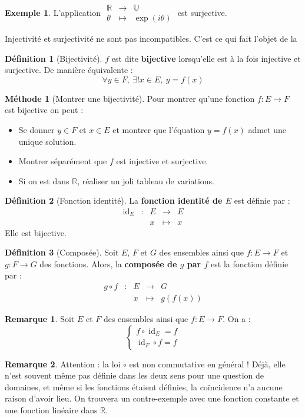\documentclass[french]{book}
\newcommand{\R}{\mathbb{R}}
\newcommand{\U}{\mathbb{U}}
\theoremstyle{plain}
\theoremstyle{definition}
\newtheorem{dfn}{Définition}[chapter]
\newtheorem{exa}{Exemple}[chapter]
\newtheorem{rmq}{Remarque}[chapter]
\newtheorem{met}{Méthode}[chapter]
\theoremstyle{remark}
\DeclareMathOperator{\id}{id}
\begin{document}
\begin{exa}
	L'application $\begin{array}{ccc}\R&\rightarrow&\U\\ \theta&\mapsto&\exp(i\theta)\end{array}$ est surjective.
\end{exa}
Injectivité et surjectivité ne sont pas incompatibles. C'est ce qui fait l'objet de la
\begin{dfn}[Bijectivité]
	$f$ est dite \textbf{bijective} lorsqu'elle est à la fois injective et surjective. De manière équivalente : $$\forall y\in F,\ \exists!x\in E,\ y=f(x)$$
\end{dfn}
\begin{met}[Montrer une bijectivité]
	Pour montrer qu'une fonction $f:E\rightarrow F$ est bijective on peut :
	\begin{itemize}
		\item Se donner $y\in F$ et $x\in E$ et montrer que l'équation $y=f(x)$ admet une unique solution.
		\item Montrer séparément que $f$ est injective et surjective.
		\item Si on est dans $\R$, réaliser un joli tableau de variations.
	\end{itemize}
\end{met}
\begin{dfn}[Fonction identité]
	La \textbf{fonction identité de $E$} est définie par : $$\begin{array}{ccccc}\id_E&:&E&\rightarrow&E\\&&x&\mapsto&x\end{array}$$ Elle est bijective.
\end{dfn}
\begin{dfn}[Composée]
	Soit $E$, $F$ et $G$ des ensembles ainsi que $f:E\rightarrow F$ et $g:F\rightarrow G$ des fonctions. Alors, la \textbf{composée de $g$ par $f$} est la fonction définie par : $$\begin{array}{ccccc}g\circ f&:&E&\rightarrow&G\\&&x&\mapsto&g(f(x))\end{array}$$
\end{dfn}
\begin{rmq}
	Soit $E$ et $F$ des ensembles ainsi que $f:E\rightarrow F$. On a : $$\begin{cases}
		f\circ\id_E=f \\ \id_F\circ f=f
	\end{cases}$$
\end{rmq}
\begin{rmq}
	Attention : la loi $\circ$ est non commutative en général ! Déjà, elle n'est souvent même pas définie dans les deux sens pour une question de domaines, et même si les fonctions étaient définies, la coïncidence n'a aucune raison d'avoir lieu. On trouvera un contre-exemple avec une fonction constante et une fonction linéaire dans $\R$.
\end{rmq}
\end{document}
